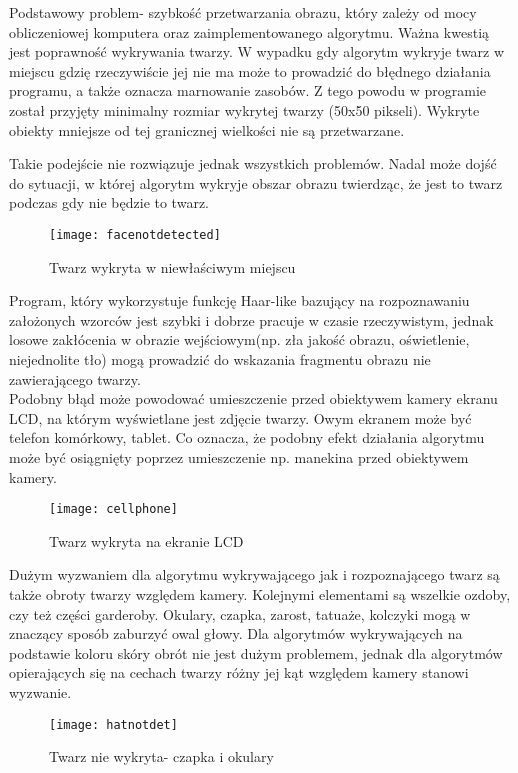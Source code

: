 \documentclass[eng,printmode]{mgr}
\begin{document}
Podstawowy problem- szybkość przetwarzania obrazu, który zależy od mocy obliczeniowej
komputera oraz zaimplementowanego algorytmu. Ważna kwestią jest poprawność wykrywania
twarzy. W wypadku gdy algorytm wykryje twarz w miejscu gdzię rzeczywiście jej nie ma może
to prowadzić do błędnego działania programu, a także oznacza marnowanie zasobów. Z tego powodu w programie został przyjęty minimalny rozmiar wykrytej twarzy (50x50 pikseli). Wykryte obiekty mniejsze od tej granicznej wielkości nie są przetwarzane.

Takie podejście nie rozwiązuje jednak wszystkich problemów. Nadal może dojść do sytuacji, w której algorytm wykryje obszar obrazu twierdząc, że jest to twarz podczas gdy nie będzie to twarz.\\
\begin{figure}[placement h]
\texttt{[image: facenotdetected]}
\caption{Twarz wykryta w niewłaściwym miejscu}
\end{figure}

Program, który wykorzystuje funkcję Haar-like bazujący na rozpoznawaniu założonych wzorców jest szybki i dobrze pracuje w czasie rzeczywistym, jednak losowe zakłócenia w obrazie wejściowym(np. zła jakość obrazu, oświetlenie, niejednolite tło) mogą prowadzić do wskazania fragmentu obrazu nie zawierającego twarzy.\\

Podobny błąd może powodować umieszczenie przed obiektywem kamery ekranu LCD, na którym wyświetlane jest zdjęcie twarzy. Owym ekranem może być telefon komórkowy, tablet. Co oznacza, że podobny efekt działania algorytmu może być osiągnięty poprzez umieszczenie np. manekina przed obiektywem kamery.\\
\begin{figure}[placement h]
\texttt{[image: cellphone]}
\caption{Twarz wykryta na ekranie LCD}
\end{figure}

Dużym wyzwaniem dla algorytmu wykrywającego jak i rozpoznającego twarz są także obroty twarzy względem kamery. Kolejnymi elementami są wszelkie ozdoby, czy też części garderoby. Okulary, czapka, zarost, tatuaże, kolczyki mogą w znaczący sposób zaburzyć owal głowy. Dla algorytmów wykrywających na podstawie koloru skóry obrót nie jest dużym problemem, jednak dla algorytmów opierających się na cechach twarzy różny jej kąt względem kamery stanowi wyzwanie.\\
\begin{figure}[placement h]
\texttt{[image: hatnotdet]}
\caption{Twarz nie wykryta- czapka i okulary}
\end{figure}
\end{document}
